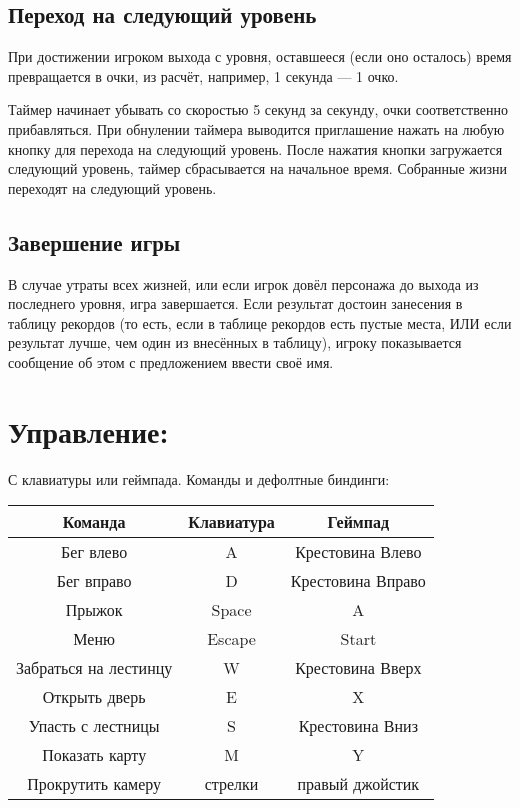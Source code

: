 \documentclass[12pt,a4paper]{article}
\begin{document}
\subsection{Переход на следующий уровень}
При достижении игроком выхода с уровня, оставшееся (если оно осталось) время превращается в очки, из расчёт, например, 1 секунда --- 1 очко.

Таймер начинает убывать со скоростью 5 секунд за секунду, очки соответственно прибавляться. При обнулении таймера выводится приглашение нажать на любую кнопку для перехода на следующий уровень. После нажатия кнопки загружается следующий уровень, таймер сбрасывается на начальное время. Собранные жизни переходят на следующий уровень.\\

\subsection{Завершение игры}
В случае утраты всех жизней, или если игрок довёл персонажа до выхода из последнего уровня, игра завершается. Если результат достоин занесения в таблицу рекордов (то есть, если в таблице рекордов есть пустые места, ИЛИ если результат лучше, чем один из внесённых в таблицу), игроку показывается сообщение об этом с предложением ввести своё имя.\\

\section{Управление:}
С клавиатуры или геймпада.
Команды и дефолтные биндинги:\\

\begin{tabulary}{\linewidth}{|C|C|C|}
\hline
Команда & Клавиатура & Геймпад\\
\hline
Бег влево & A & Крестовина Влево \\
\hline
Бег вправо & D & Крестовина Вправо \\
\hline
Прыжок & Space & A \\
\hline
Меню & Escape & Start \\
\hline
Забраться на лестинцу & W & Крестовина Вверх \\
\hline
Открыть дверь & E & X \\
\hline
Упасть с лестницы & S & Крестовина Вниз \\
\hline
Показать карту & M & Y \\
\hline
Прокрутить камеру & стрелки & правый джойстик \\
\hline
\end{tabulary}
\vspace{10pt}
\end{document}
